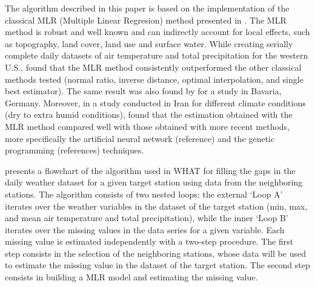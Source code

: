\documentclass[ARTICLETHERMIC.tex]{subfiles}
\begin{document}
The algorithm described in this paper is based on the implementation of the classical MLR (Multiple Linear Regresion) method presented in \cite{eischeid_creating_2000}. The MLR method is robust and well known and can indirectly account for local effects, such as topography, land cover, land use and surface water. While creating serially complete daily datasets of air temperature and total precipitation for the western U.S., \cite{eischeid_creating_2000} found that the MLR method consistently outperformed the other classical methods tested (normal ratio, inverse distance, optimal interpolation, and single best estimator). The same result was also found by \cite{xia_forest_1999} for a study in Bavaria, Germany. Moreover, in a study conducted in Iran for different climate conditions (dry to extra humid conditions), \cite{kashani_evaluation_2011} found that the estimation obtained with the MLR method compared well with those obtained with more recent methods, more specifically the artificial neural network (reference) and the genetic programming (references) techniques.

 presents a flowchart of the algorithm used in WHAT for filling the gaps in the daily weather dataset for a given target station using data from the neighboring stations. The algorithm consists of two nested loops: the external `Loop A' iterates over the weather variables in the dataset of the target station (min, max, and mean air temperature and total precipitation), while the inner `Loop B' iterates over the missing values in the data series for a given variable. Each missing value is estimated independently with a two-step procedure. The first step consists in the selection of the neighboring stations, whose data will be used to estimate the missing value in the dataset of the target station. The second step consists in building a MLR model and estimating the missing value.
\end{document}
